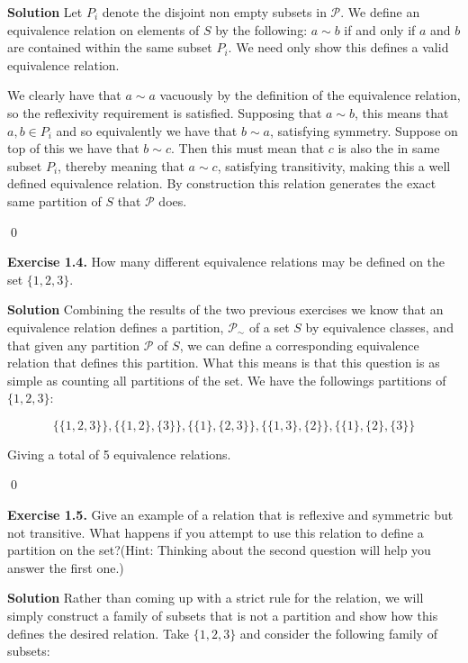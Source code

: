 \documentclass[titlepage]{article}
\begin{document}
\medskip

\textbf{Solution} Let $P_i$ denote the disjoint non empty subsets in $\mathscr{P}$. We define an equivalence relation on elements of $S$ by the following: $a \sim b$ if and only if $a$ and $b$ are contained within the same subset $P_i$. We need only show this defines a valid equivalence relation.

We clearly have that $a \sim a$ vacuously by the definition of the equivalence relation, so the reflexivity requirement is satisfied. Supposing that $a \sim b$, this means that $a,b \in P_i$ and so equivalently we have that $b \sim a$, satisfying symmetry. Suppose on top of this we have that $b \sim c$. Then this must mean that $c$ is also the in same subset $P_i$, thereby meaning that $a \sim c$, satisfying transitivity, making this a well defined equivalence relation. By construction this relation generates the exact same partition of $S$ that $\mathscr{P}$ does.

\qed 

\bigskip

\textbf{Exercise 1.4.} How many different equivalence relations may be defined on the set $\{1,2,3\}$.

\medskip

\textbf{Solution} Combining the results of the two previous exercises we know that an equivalence relation defines a partition, $\mathscr{P}_{\sim}$ of a set $S$ by equivalence classes, and that given any partition $\mathscr{P}$ of $S$, we can define a corresponding equivalence relation that defines this partition. What this means is that this question is as simple as counting all partitions of the set. We have the followings partitions of $\{1,2,3\}$:

\[ \{ \{1,2,3\} \}, \{ \{1,2 \}, \{3 \} \}, \{ \{1 \}, \{2,3 \} \}, \{ \{1,3 \}, \{2 \} \}, \{ \{1 \}, \{2 \}, \{3 \} \} \]

Giving a total of 5 equivalence relations.

\qed

\bigskip

\textbf{Exercise 1.5.} Give an example of a relation that is reflexive and symmetric but not transitive. What happens if you attempt to use this relation to define a partition on the set?(Hint: Thinking about the second question will help you answer the first one.)

\medskip

\textbf{Solution} Rather than coming up with a strict rule for the relation, we will simply construct a family of subsets that is not a partition and show how this defines the desired relation. Take $\{1,2,3 \}$ and consider the following family of subsets:
\end{document}

